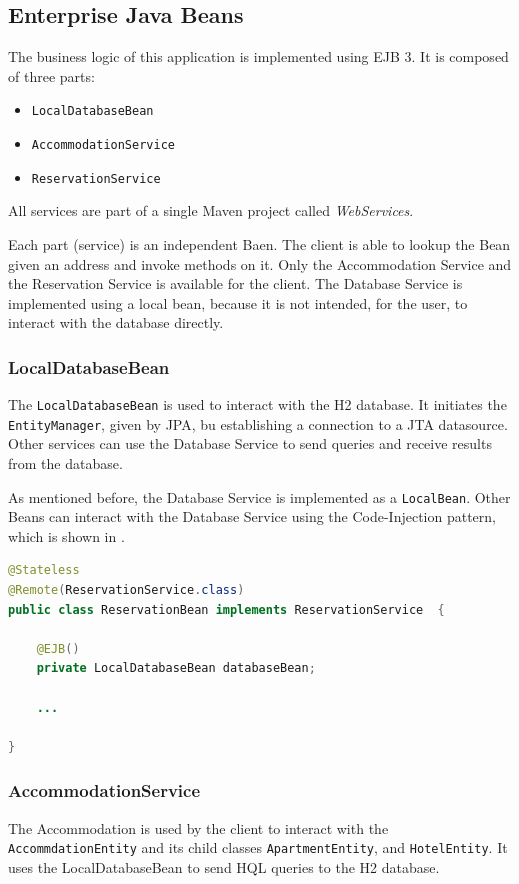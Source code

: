 \subsection{Enterprise Java Beans}
The business logic of this application is implemented using EJB 3. It is composed of three parts:
\begin{itemize}
\item \texttt{LocalDatabaseBean}
\item \texttt{AccommodationService}
\item \texttt{ReservationService}
\end{itemize}
All services are part of a single Maven project called \textit{WebServices}.

Each part (service) is an independent Baen. The client is able to lookup the Bean given an address and invoke methods on it. Only the Accommodation Service and the Reservation Service is available for the client. The Database Service is implemented using a local bean, because it is not intended, for the user, to interact with the database directly.


\subsubsection{LocalDatabaseBean}
The \texttt{LocalDatabaseBean} is used to interact with the H2 database. It initiates the \texttt{EntityManager}, given by JPA, bu establishing a connection to a JTA datasource. Other services can use the Database Service to send queries and receive results from the database.

As mentioned before, the Database Service is implemented as a \texttt{LocalBean}. Other Beans can interact with the Database Service using the Code-Injection pattern, which is shown in .
\begin{lstlisting}[label=lst:02_impl_ejb_db_cinjection, caption=Usage of the \texttt{LocalDatabaseBean} using Code-Injection, language=java]
@Stateless
@Remote(ReservationService.class)
public class ReservationBean implements ReservationService  {

    @EJB()
    private LocalDatabaseBean databaseBean;
    
    ...
    
}
\end{lstlisting}


\subsubsection{AccommodationService}
The Accommodation is used by the client to interact with the \texttt{AccommdationEntity} and its child classes \texttt{ApartmentEntity}, and \texttt{HotelEntity}. It uses the LocalDatabaseBean to send HQL queries to the H2 database.

